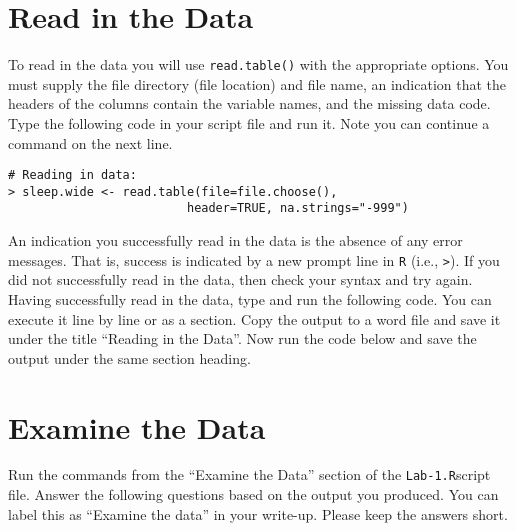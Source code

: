 \documentclass[]{article}
\begin{document}
%
%

\section*{Read in the Data}

\noindent To read in the data you will use \texttt{read.table()} with the appropriate options. You must supply the file directory (file location) and file name, an indication that the headers of the columns contain the variable names, and the missing data code. Type the following code in your script file and run it. Note you can continue a command on the next line.

\begin{verbatim}
# Reading in data:
> sleep.wide <- read.table(file=file.choose(),
                         header=TRUE, na.strings="-999")
\end{verbatim}

\noindent An indication you successfully read in the data is the absence of any error messages. That is, success is indicated by a new prompt line in \texttt{R} (i.e., \texttt{>}). If you did not successfully read in the data, then check your syntax and try again. Having successfully read in the data, type and run the following code. You can execute it line by line or as a section. Copy the output to a word file and save it under the title ``Reading in the Data''. Now run the code below and save the output under the same section heading.

\section*{Examine the Data}

\noindent Run the commands from the ``Examine the Data'' section of the \texttt{Lab-1.R}script file. Answer the following questions based on the output you produced. You can label this as ``Examine the data'' in your write-up. Please keep the answers short.
\end{document}
